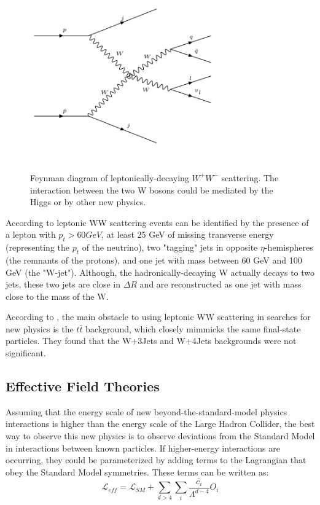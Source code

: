 \documentclass[10pt]{ucscthesisbs}
\begin{document}
\begin{figure}
\includegraphics[width=8cm, height=8cm]{images/WWScatteringDiagram}
\caption{Feynman diagram of leptonically-decaying $W^{+}W^{-}$ scattering. The interaction between the two W bosons could be mediated by the Higgs or by other new physics.}
\label{fig:WWScatteringDiagram}
\end{figure}
According to \cite{atlasnote2012} leptonic WW scattering events can be identified by the presence of a lepton with $p_t > 60 GeV$, at least 25 GeV of missing transverse energy (representing the $p_t$ of the neutrino), two "tagging" jets in opposite $\eta$-hemispheres (the remnants of the protons), and one jet with mass between 60 GeV and 100 GeV (the "W-jet"). Although, the hadronically-decaying W actually decays to two jets, these two jets are close in $\Delta R$ and are reconstructed as one jet with mass close to the mass of the W. 

According to \cite{atlasnote2012}, the main obstacle to using leptonic WW scattering in searches for new physics is the $t\bar{t}$ background, which closely mimmicks the same final-state particles. They found that the W+3Jets and W+4Jets backgrounds were not significant.
\subsection{Effective Field Theories}
Assuming that the energy scale of new beyond-the-standard-model physics interactions is higher than the energy scale of the Large Hadron Collider, the best way to observe this new physics is to observe deviations from the Standard Model in interactions between known particles. If higher-energy interactions are occurring, they could be parameterized by adding terms to the Lagrangian that obey the Standard Model symmetries. These terms can be written as:
\begin{equation} \label{eq:effectivelagrangian}
\mathcal{L}_{eff} = \mathcal{L}_{SM} + \sum_{d>4}{\sum_{i}{\frac{\bar{c_i}}{\Lambda^{d-4}}O_i}}
\end{equation}
\end{document}
